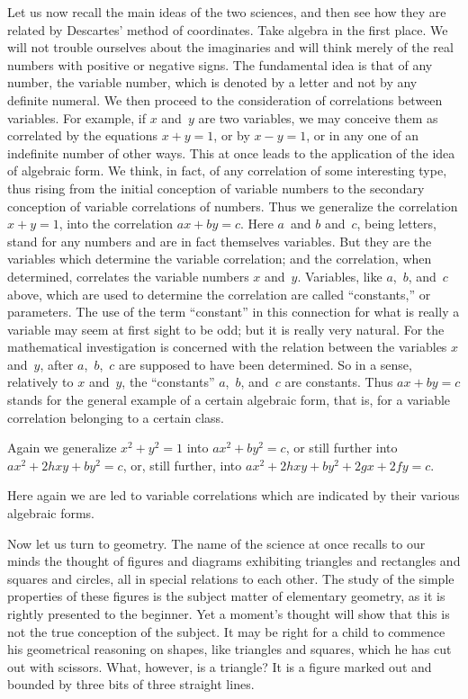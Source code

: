 \documentclass[12pt,leqno]{book}[2005/09/16]
\newcommand{\PageSep}[1]{\ignorespaces}
\begin{document}
Let us now recall the main ideas of the two
sciences, and then see how they are related
by Descartes' method of coordinates. Take
%
algebra in the first place. We will not trouble
ourselves about the imaginaries and will
think merely of the real numbers with positive
or negative signs. The fundamental idea
is that of any number, the variable number,
which is denoted by a letter and not by any
definite numeral. We then proceed to the
consideration of correlations between variables.
For example, if $x$ and~$y$ are two variables,
\PageSep{117}
we may conceive them as correlated by
the equations $x + y = 1$, or by $x - y = 1$, or in
any one of an indefinite number of other ways.
This at once leads to the application of the
%
idea of algebraic form. We think, in fact, of
any correlation of some interesting type, thus
rising from the initial conception of variable
numbers to the secondary conception of
variable correlations of numbers. Thus we
generalize the correlation $x + y = 1$, into the
correlation $ax + by = c$. Here $a$~and $b$ and~$c$,
being letters, stand for any numbers and are
in fact themselves variables. But they are
the variables which determine the variable
correlation; and the correlation, when determined,
correlates the variable numbers $x$ and~$y$.
Variables, like $a$,~$b$, and~$c$ above, which
are used to determine the correlation are
called ``constants,'' or parameters. The use
%
%
of the term ``constant'' in this connection
for what is really a variable may seem at first
sight to be odd; but it is really very natural.
For the mathematical investigation is concerned
with the relation between the variables
$x$ and~$y$, after $a$,~$b$,~$c$ are supposed to have been
determined. So in a sense, relatively to $x$
and~$y$, the ``constants'' $a$,~$b$, and~$c$ are constants.
Thus $ax + by = c$ stands for the general
example of a certain algebraic form, that is,
for a variable correlation belonging to a certain
class.
\PageSep{118}

Again we generalize $x^{2} + y^{2} = 1$ into $ax^{2} + by^{2} = c$,
or still further into $ax^{2} + 2hxy + by^{2} = c$,
or, still further, into $ax^{2} + 2hxy + by^{2} + 2gx + 2fy = c$.

Here again we are led to variable correlations
which are indicated by their various algebraic
forms.

Now let us turn to geometry. The name
of the science at once recalls to our minds
the thought of figures and diagrams exhibiting
triangles and rectangles and squares and
circles, all in special relations to each other.
The study of the simple properties of these
figures is the subject matter of elementary
geometry, as it is rightly presented to the
beginner. Yet a moment's thought will show
that this is not the true conception of the
subject. It may be right for a child to commence
his geometrical reasoning on shapes,
like triangles and squares, which he has cut
out with scissors. What, however, is a triangle?
It is a figure marked out and bounded
by three bits of three straight lines.
\end{document}

